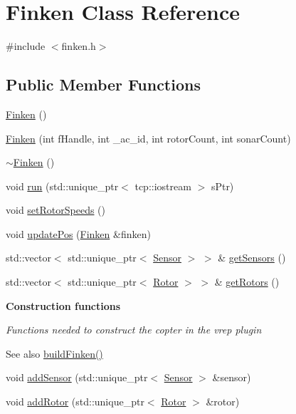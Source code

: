 \hypertarget{classFinken}{}\section{Finken Class Reference}
\label{classFinken}


{\ttfamily \#include $<$finken.\+h$>$}

\subsection*{Public Member Functions}
\begin{DoxyCompactItemize}
\item 
\hyperlink{classFinken_afb256567ee9aa96c409fdb0529b4f228}{Finken} ()
\item 
\hyperlink{classFinken_a26a9cd42385ec3ae010e2ad1387d9ce6}{Finken} (int f\+Handle, int \+\_\+ac\+\_\+id, int rotor\+Count, int sonar\+Count)
\item 
\hyperlink{classFinken_a94e6a3b5b14ec7ee351d219eb17be45b}{$\sim$\+Finken} ()
\item 
void \hyperlink{classFinken_ae3c3abbf571407e210f4b03b68cada9d}{run} (std\+::unique\+\_\+ptr$<$ tcp\+::iostream $>$ s\+Ptr)
\item 
void \hyperlink{classFinken_aaead1098c0752c8ec5b99bccd9945f3b}{set\+Rotor\+Speeds} ()
\item 
void \hyperlink{classFinken_afddc56af42f000ff17c4a00779b4ad6a}{update\+Pos} (\hyperlink{classFinken}{Finken} \&finken)
\item 
std\+::vector$<$ std\+::unique\+\_\+ptr$<$ \hyperlink{classSensor}{Sensor} $>$ $>$ \& \hyperlink{classFinken_a1215883fb6df7c4853e498dec43b4e6a}{get\+Sensors} ()
\item 
std\+::vector$<$ std\+::unique\+\_\+ptr$<$ \hyperlink{classRotor}{Rotor} $>$ $>$ \& \hyperlink{classFinken_a610ce496f1c5f2ca22850ee26c54510c}{get\+Rotors} ()
\end{DoxyCompactItemize}
\begin{Indent}{\bf Construction functions}\par
{\em Functions needed to construct the copter in the vrep plugin \begin{DoxySeeAlso}{See also}
\hyperlink{finken_8h_a5810da3d23510cfe71d23902cddb8b51}{build\+Finken()} 
\end{DoxySeeAlso}
}\begin{DoxyCompactItemize}
\item 
void \hyperlink{classFinken_a2f2adb211e80a689f580b87730aeb9d1}{add\+Sensor} (std\+::unique\+\_\+ptr$<$ \hyperlink{classSensor}{Sensor} $>$ \&sensor)
\item 
void \hyperlink{classFinken_a4ac9d9b37fba41147a83a36286fbe91b}{add\+Rotor} (std\+::unique\+\_\+ptr$<$ \hyperlink{classRotor}{Rotor} $>$ \&rotor)
\end{DoxyCompactItemize}
\end{Indent}
